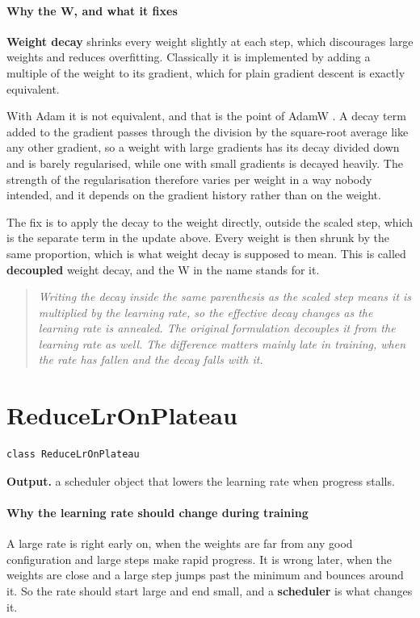 \paragraph{Why the W, and what it fixes}
\textbf{Weight decay} shrinks every weight slightly at each step, which discourages large weights and reduces overfitting. Classically it is implemented by adding a multiple of the weight to its gradient, which for plain gradient descent is exactly equivalent.

With Adam it is not equivalent, and that is the point of AdamW \cite{loshchilov2019}. A decay term added to the gradient passes through the division by the square-root average like any other gradient, so a weight with large gradients has its decay divided down and is barely regularised, while one with small gradients is decayed heavily. The strength of the regularisation therefore varies per weight in a way nobody intended, and it depends on the gradient history rather than on the weight.

The fix is to apply the decay to the weight directly, outside the scaled step, which is the separate term in the update above. Every weight is then shrunk by the same proportion, which is what weight decay is supposed to mean. This is called \textbf{decoupled} weight decay, and the W in the name stands for it.


\begin{quote}\small\itshape Writing the decay inside the same parenthesis as the scaled step means it is multiplied by the learning rate, so the effective decay changes as the learning rate is annealed. The original formulation decouples it from the learning rate as well. The difference matters mainly late in training, when the rate has fallen and the decay falls with it.\end{quote}

\section{ReduceLrOnPlateau}
\begin{lstlisting}[style=sig]
class ReduceLrOnPlateau
\end{lstlisting}

\noindent\textbf{Output.} a scheduler object that lowers the learning rate when progress stalls.


\paragraph{Why the learning rate should change during training}
A large rate is right early on, when the weights are far from any good configuration and large steps make rapid progress. It is wrong later, when the weights are close and a large step jumps past the minimum and bounces around it. So the rate should start large and end small, and a \textbf{scheduler} is what changes it.


